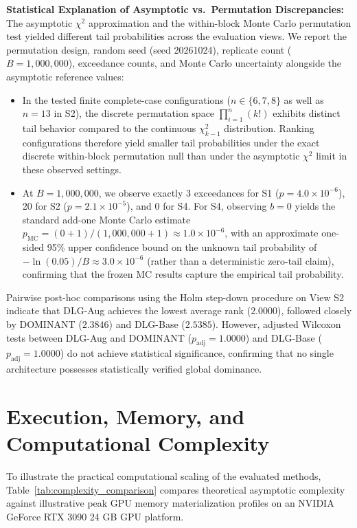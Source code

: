 \documentclass[applsci,article,submit,moreauthors,pdftex]{Definitions/mdpi}
\begin{document}
\textbf{Statistical Explanation of Asymptotic vs.\ Permutation Discrepancies:}
The asymptotic $\chi^2$ approximation and the within-block Monte Carlo permutation test yielded different tail probabilities across the evaluation views. We report the permutation design, random seed (seed 20261024), replicate count ($B=1{,}000{,}000$), exceedance counts, and Monte Carlo uncertainty alongside the asymptotic reference values:
\begin{itemize}
    \item In the tested finite complete-case configurations ($n \in \{6, 7, 8\}$ as well as $n=13$ in S2), the discrete permutation space $\prod_{i=1}^n (k!)$ exhibits distinct tail behavior compared to the continuous $\chi^2_{k-1}$ distribution. Ranking configurations therefore yield smaller tail probabilities under the exact discrete within-block permutation null than under the asymptotic $\chi^2$ limit in these observed settings.
    \item At $B=1{,}000{,}000$, we observe exactly 3 exceedances for S1 ($p = 4.0 \times 10^{-6}$), 20 for S2 ($p = 2.1 \times 10^{-5}$), and 0 for S4. For S4, observing $b=0$ yields the standard add-one Monte Carlo estimate $p_{\mathrm{MC}} = (0+1)/(1{,}000{,}000+1) \approx 1.0 \times 10^{-6}$, with an approximate one-sided 95\% upper confidence bound on the unknown tail probability of $-\ln(0.05)/B \approx 3.0 \times 10^{-6}$ (rather than a deterministic zero-tail claim), confirming that the frozen MC results capture the empirical tail probability.
\end{itemize}

Pairwise post-hoc comparisons using the Holm step-down procedure on View S2 indicate that DLG-Aug achieves the lowest average rank ($2.0000$), followed closely by DOMINANT ($2.3846$) and DLG-Base ($2.5385$). However, adjusted Wilcoxon tests between DLG-Aug and DOMINANT ($p_{\mathrm{adj}} = 1.0000$) and DLG-Base ($p_{\mathrm{adj}} = 1.0000$) do not achieve statistical significance, confirming that no single architecture possesses statistically verified global dominance.

\section{Execution, Memory, and Computational Complexity}
\label{sec:execution_complexity}
To illustrate the practical computational scaling of the evaluated methods, Table~\ref{tab:complexity_comparison} compares theoretical asymptotic complexity against illustrative peak GPU memory materialization profiles on an NVIDIA GeForce RTX 3090 24 GB GPU platform.
\end{document}
